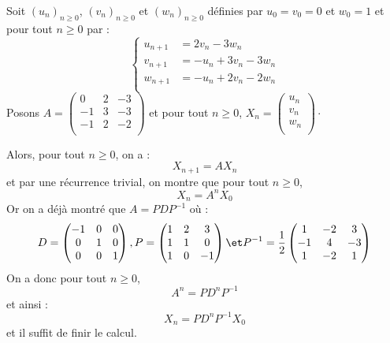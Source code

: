 \documentclass[a4paper,10pt]{report}
\begin{document}
\begin{ex} Soit $(u_n)_{n \geq 0}$, $(v_n)_{n \geq 0}$ et $(w_n)_{n \geq 0}$ définies par $u_0=v_0=0$ et $w_0=1$ et pour tout $n \geq 0$ par :
$$ \left\lbrace \begin{array}{cll}
u_{n+1} & = 2v_n-3w_n \\
v_{n+1} & = -u_n+3v_n-3w_n \\
w_{n+1} & = -u_n +2v_n-2w_n \\
\end{array}\right.$$
Posons $A = \begin{pmatrix}
0& 2 & -3 \\
-1 & 3 & -3 \\
-1 & 2 & -2 \\
\end{pmatrix}$ et pour tout $n \geq 0$, $X_n = \begin{pmatrix}
u_n \\
v_n \\
w_n \\
\end{pmatrix}\cdot$

\medskip

\noindent Alors, pour tout $n \geq 0$, on a :
$$ X_{n+1}=A X_n$$
et par une récurrence trivial, on montre que pour tout $n \geq 0$,
$$ X_n = A^n X_0$$
Or on a déjà montré que $A=PDP^{-1}$ où :
$$D = \begin{pmatrix}
-1 & 0 & 0 \\
0 & 1 & 0 \\
0 & 0 & 1 \\
\end{pmatrix}, P = \begin{pmatrix}
1 & 2  & 3   \\
1 & 1  & 0 \\
1 & 0  & -1 \\ 
\end{pmatrix} \et P^{-1} = \frac{1}{2} \begin{pmatrix}
1 & -2 & 3 \\
-1 & 4 & -3 \\
1 & -2 &  1 \\
\end{pmatrix}$$
On a donc pour tout $n \geq 0$,
$$ A^n = P D^{n}P^{-1}$$
et ainsi :
$$ X_n = PD^{n}P^{-1} X_0$$
et il suffit de finir le calcul.
\end{ex}
\end{document}
